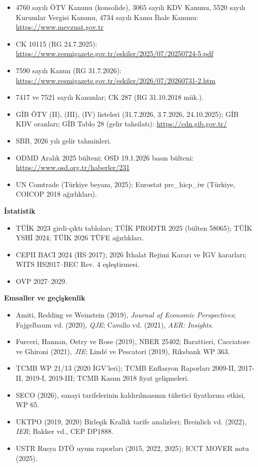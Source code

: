 \begin{itemize}
\tightlist
\item
  4760 sayılı ÖTV Kanunu (konsolide), 3065 sayılı KDV Kanunu, 5520 sayılı Kurumlar Vergisi Kanunu, 4734 sayılı Kamu İhale Kanunu: \url{https://www.mevzuat.gov.tr}
\item
  CK 10115 (RG 24.7.2025): \url{https://www.resmigazete.gov.tr/eskiler/2025/07/20250724-5.pdf}
\item
  7590 sayılı Kanun (RG 31.7.2026): \url{https://www.resmigazete.gov.tr/eskiler/2026/07/20260731-2.htm}
\item
  7417 ve 7521 sayılı Kanunlar; CK 287 (RG 31.10.2018 mük.).
\item
  GİB ÖTV (II), (III), (IV) listeleri (31.7.2026, 3.7.2026, 24.10.2025); GİB KDV oranları; GİB Tablo 28 (gelir tahsilatı): \url{https://cdn.gib.gov.tr/}
\item
  SBB, 2026 yılı gelir tahminleri.
\item
  ODMD Aralık 2025 bülteni; OSD 19.1.2026 basın bülteni: \url{https://www.osd.org.tr/haberler/231}
\item
  UN Comtrade (Türkiye beyanı, 2025); Eurostat prc\_hicp\_iw (Türkiye, COICOP 2018 ağırlıkları).
\end{itemize}

\textbf{İstatistik}

\begin{itemize}
\tightlist
\item
  TÜİK 2023 girdi-çıktı tabloları; TÜİK PRODTR 2025 (bülten 58065); TÜİK YSHİ 2024; TÜİK 2026 TÜFE ağırlıkları.
\item
  CEPII BACI 2024 (HS 2017); 2026 İthalat Rejimi Kararı ve İGV kararları; WITS HS2017--BEC Rev. 4 eşleştirmesi.
\item
  OVP 2027--2029.
\end{itemize}

\textbf{Emsaller ve geçişkenlik}

\begin{itemize}
\tightlist
\item
  Amiti, Redding ve Weinstein (2019), \emph{Journal of Economic Perspectives}; Fajgelbaum vd. (2020), \emph{QJE}; Cavallo vd. (2021), \emph{AER: Insights}.
\item
  Furceri, Hannan, Ostry ve Rose (2019), NBER 25402; Barattieri, Cacciatore ve Ghironi (2021), \emph{JIE}; Lindé ve Pescatori (2019), Riksbank WP 363.
\item
  TCMB WP 21/13 (2020 İGV'leri); TCMB Enflasyon Raporları 2009-II, 2017-II, 2019-I, 2019-III; TCMB Kasım 2018 fiyat gelişmeleri.
\item
  SECO (2026), sanayi tarifelerinin kaldırılmasının tüketici fiyatlarına etkisi, WP 65.
\item
  UKTPO (2019, 2020) Birleşik Krallık tarife analizleri; Breinlich vd. (2022), \emph{IER}; Bakker vd., CEP DP1888.
\item
  USTR Rusya DTÖ uyum raporları (2015, 2022, 2025); ICCT MOVER notu (2025).
\end{itemize}
